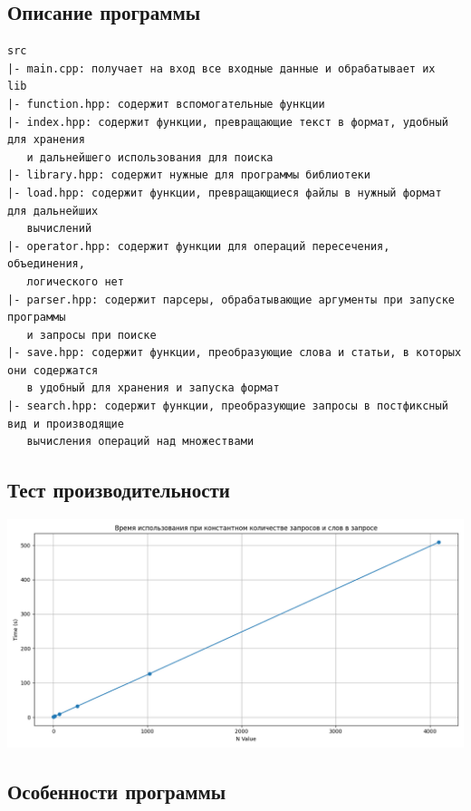 \documentclass[12pt]{article}
\begin{document}
\subsection*{Описание программы}
\begin{verbatim}
src
|- main.cpp: получает на вход все входные данные и обрабатывает их
lib
|- function.hpp: содержит вспомогательные функции
|- index.hpp: содержит функции, превращающие текст в формат, удобный для хранения
   и дальнейшего использования для поиска
|- library.hpp: содержит нужные для программы библиотеки
|- load.hpp: содержит функции, превращающиеся файлы в нужный формат для дальнейших
   вычислений
|- operator.hpp: содержит функции для операций пересечения, объединения,
   логического нет
|- parser.hpp: содержит парсеры, обрабатывающие аргументы при запуске программы
   и запросы при поиске
|- save.hpp: содержит функции, преобразующие слова и статьи, в которых они содержатся
   в удобный для хранения и запуска формат
|- search.hpp: содержит функции, преобразующие запросы в постфиксный вид и производящие
   вычисления операций над множествами
\end{verbatim}

\subsection*{Тест производительности}

\includegraphics[width=7in]{Figure_1.png}

\subsection*{Особенности программы}
\end{document}
